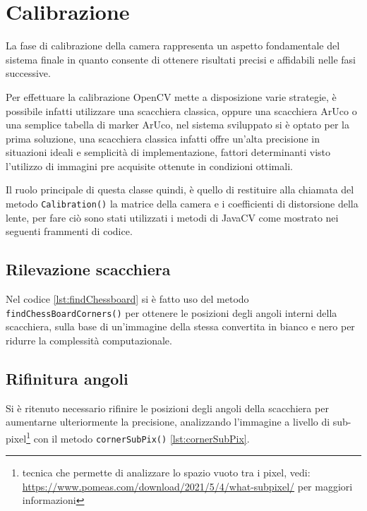 \documentclass[12pt,a4paper,openright,twoside]{book}
\begin{document}





\section{Calibrazione}
La fase di calibrazione della camera rappresenta un aspetto fondamentale del sistema finale in quanto consente di ottenere risultati precisi e affidabili nelle fasi successive.

Per effettuare la calibrazione OpenCV mette a disposizione varie strategie, è possibile infatti utilizzare una scacchiera classica, oppure una scacchiera ArUco o una semplice tabella di marker ArUco, nel sistema sviluppato si è optato per la prima soluzione, una scacchiera classica infatti offre un'alta precisione in situazioni ideali e semplicità di implementazione, fattori determinanti visto l'utilizzo di immagini pre acquisite ottenute in condizioni ottimali.

Il ruolo principale di questa classe quindi, è quello di restituire alla chiamata del metodo \texttt{Calibration()} la matrice della camera e i coefficienti di distorsione della lente, per fare ciò sono stati utilizzati i metodi di JavaCV come mostrato nei seguenti frammenti di codice.

\subsection{Rilevazione scacchiera}
Nel codice \cref{lst:findChessboard} si è fatto uso del metodo \texttt{findChessBoardCorners()} per ottenere le posizioni degli angoli interni della scacchiera, sulla base di un'immagine della stessa convertita in bianco e nero per ridurre la complessità computazionale.
	
\subsection{Rifinitura angoli}
Si è ritenuto necessario rifinire le posizioni degli angoli della scacchiera per aumentarne ulteriormente la precisione, analizzando l'immagine a livello di sub-pixel\footnote{tecnica che permette di analizzare lo spazio vuoto tra i pixel, vedi: \url{https://www.pomeas.com/download/2021/5/4/what-subpixel/} per maggiori informazioni} con il metodo \texttt{cornerSubPix()} \cref{lst:cornerSubPix}.

\end{document}
